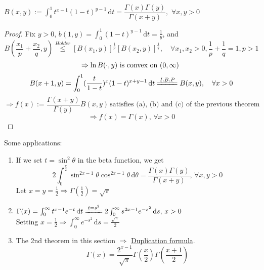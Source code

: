 \begin{theorem}
    $ B(x,y):=\int_{0}^{1} t^{x-1}(1-t)^{y-1 }\, \mathrm{d}t=\dfrac{\Gamma(x)\Gamma(y)}{\Gamma(x+y)},\,\,\forall x,y>0 $ 
 \end{theorem}
 \begin{proof}
    Fix  $ y>0  $,  $ b (1,y)=\int_{0}^{1} (1-t)^{y-1}\, \mathrm{d}t=\frac{1 }{y }  $, and 
    \[B(\frac{x_1}{p}+\frac{x_2 }{q },y)\overset{Holder}{ \leqslant  }[B(x_1,y)]^{\frac{1}{p }}[B(x_2,y)]^{\frac{1 }{q }},\quad \forall x_1,x_2>0,\frac{1 }{p }+\frac{1 }{q }=1,p>1\]
    \[\Rightarrow\ln{B(\cdot,y )}\text{ is convex on  $ (0,\infty) $ }\]
    \[B(x+1,y)=\int_{0}^{1} (\frac{t}{1-t })^x(1-t)^{x+y-1}\, \mathrm{d}t \xlongequal[]{I.B.P} B(x,y),\quad\forall x>0   \]
    \[\Rightarrow f(x):=\dfrac{\Gamma(x+y)}{\Gamma(y)}B(x,y)\,\text{satisfies (a), (b) and (c) of the previous theorem}\]
    \[\Rightarrow f(x)=\Gamma(x),\,\forall x>0\]
 \end{proof}
 Some applications: 
 \begin{enumerate}[1)]
    \item If we set  $ t=\sin^2{\theta} $ in the beta function, we get\[2 \int_{0  }^{\frac{\pi }{2}}\sin^{2x-1}{\theta}\cos^{2x-1}{\theta} \, \mathrm{d}\theta=\dfrac{\Gamma(x)\Gamma(y)}{\Gamma(x+y)},\,\forall x,y>0  \]
    Let  $ x=y=\frac{1}{2} \Rightarrow \Gamma(\frac{1}{2})=\sqrt{\pi}$ 
    \item  $ \Gamma(x)=\int_{0 }^{\infty} t^{x-1}e^{-t}\, \mathrm{d}t \xlongequal{t=s^2}2 \int_{0 }^{\infty} s^{2x-1}e^{-s^2}\, \mathrm{d}s,\,x>0     $\\
    Setting  $ x=\frac{1 }{2 }\Rightarrow \int_{0 }^{\infty} e^{-s^2}\, \mathrm{d}s=\frac{\sqrt{\pi }}{2}   $
    \item The 2nd theorem in this section  $ \Rightarrow $ \underline{Duplication formula}.\[\Gamma(x)=\dfrac{2^{x-1}}{\sqrt{\pi }}\Gamma(\frac{x }{2 })\Gamma(\frac{x+1 }{2})\]
    
 \end{enumerate} 
